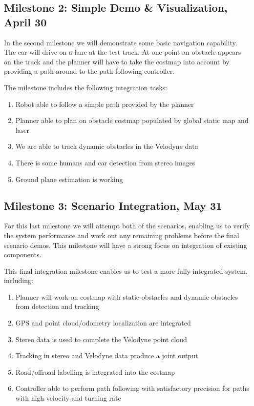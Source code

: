 \documentclass[11pt,a4paper]{article}
\begin{document}
\subsection{Milestone 2: Simple Demo \& Visualization, April 30}
\label{milestone2}

In the second milestone we will demonstrate some basic navigation capability.
The car will drive on a lane at the test track. At one point an
obstacle appears on the track and the planner will have to take the costmap
into account by providing a path around to the path following controller.

The milestone includes the following integration tasks:
\begin{enumerate}
\item Robot able to follow a simple path provided by the planner
\item Planner able to plan on obstacle costmap populated by global static map and laser
\item We are able to track dynamic obstacles in the Velodyne data
\item There is some humans and car detection from stereo images
\item Ground plane estimation is working
\end{enumerate}

\subsection{Milestone 3: Scenario Integration, May 31}
\label{milestone3}

For this last milestone we will attempt both of the scenarios, enabling
us to verify the system performance and work out any remaining problems
before the final scenario demos. This milestone will have a strong
focus on integration of existing components.

This final integration milestone enables us to test a more fully integrated system, including:
\begin{enumerate}
\item Planner will work on costmap with static obstacles and dynamic obstacles from detection and tracking
\item GPS and point cloud/odometry localization are integrated
\item Stereo data is used to complete the Velodyne point cloud
\item Tracking in stereo and Velodyne data produce a joint output
\item Road/offroad labelling is integrated into the costmap
\item Controller able to perform path following with satisfactory precision for paths with high velocity and turning rate
\end{enumerate}
\end{document}
